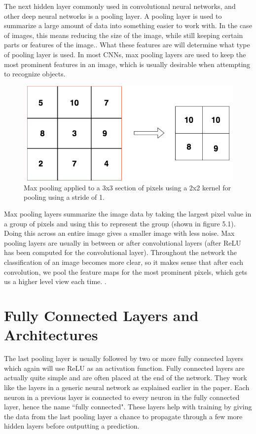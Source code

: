 \documentclass[12pt]{report} %
\begin{document}
	The next hidden layer commonly used in convolutional neural networks, and other deep neural networks is a pooling layer. A pooling layer is used to summarize a large amount of data into something easier to work with. In the case of images, this means reducing the size of the image, while still keeping certain parts or features of the image.\cite{aurelienMachineLearning}. What these features are will determine what type of pooling layer is used. In most CNNs, max pooling layers are used to keep the most prominent features in an image, which is usually desirable when attempting to recognize objects. 
\begin{figure}
\centering
\includegraphics[width=5in]{max_pooling}
\caption{Max pooling applied to a 3x3 section of pixels using a 2x2 kernel for pooling using a stride of 1.}
\end{figure}		
	Max pooling layers summarize the image data by taking the largest pixel value in a group of pixels and using this to represent the group (shown in figure 5.1). Doing this across an entire image gives a smaller image with less noise. Max pooling layers are usually in between or after convolutional layers (after ReLU has been computed for the convolutional layer). Throughout the network the classification of an image becomes more clear, so it makes sense that after each convolution, we pool the feature maps for the most prominent pixels, which gets us a higher level view each time. . 

 \section{Fully Connected Layers and Architectures}
	
	The last pooling layer is usually followed by two or more fully connected layers which again will use ReLU as an activation function. Fully connected layers are actually quite simple and are often placed at the end of the network. They work like the layers in a generic neural network as explained earlier in the paper. Each neuron in a previous layer is connected to every neuron in the fully connected layer, hence the name ``fully connected"\cite{LeonardoFully}. These layers help with training by giving the data from the last pooling layer a chance to propagate through a few more hidden layers before outputting a prediction. 
	
\end{document}

